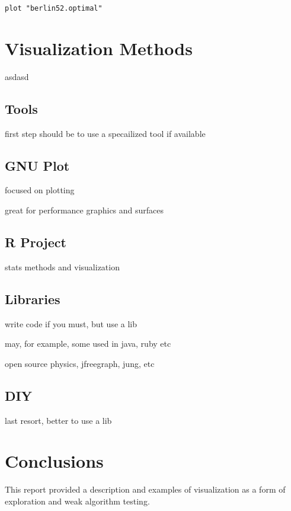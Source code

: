 \documentclass[a4paper, 11pt]{article}
\begin{document}
\begin{lstlisting}[caption=Plot cities and draw optimal tour from the Berlin52 Traveling Salesman Problem, label=tsp2]
plot "berlin52.optimal"
\end{lstlisting}


%
%
\section{Visualization Methods}
asdasd

\subsection{Tools}
first step should be to use a specailized tool if available

\subsection{GNU Plot}
focused on plotting

great for performance graphics and surfaces

\subsection{R Project}
stats methods and visualization


\subsection{Libraries}
write code if you must, but use a lib

may, for example, some used in java, ruby etc

open source physics, jfreegraph, jung, etc


\subsection{DIY}
last resort, better to use a lib


%
%
\section{Conclusions}
\label{sec:conclusions}
This report provided a description and examples of visualization as a form of exploration and weak algorithm testing. 



\end{document}
